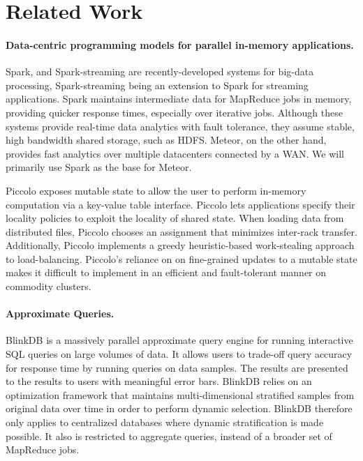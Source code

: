 \section{Related Work}

\paragraph{Data-centric programming models for parallel in-memory applications.}
Spark, and Spark-streaming \cite{spark} are recently-developed systems for big-data processing, Spark-streaming being an extension to Spark for streaming applications. Spark maintains intermediate data for MapReduce jobs in memory, providing quicker response times, especially over iterative jobs. Although these systems provide real-time data analytics with fault tolerance, they assume stable, high bandwidth shared storage, such as HDFS. Meteor, on the other hand, provides fast analytics over multiple datacenters connected by a WAN. We will primarily use Spark as the base for Meteor.  

Piccolo \cite{piccolo} exposes mutable state to allow the user to perform in-memory computation via a key-value table interface. Piccolo lets applications specify their locality policies to exploit the locality of shared state. When loading data from distributed files, Piccolo chooses an assignment that minimizes inter-rack transfer. Additionally, Piccolo implements a greedy heuristic-based work-stealing approach to load-balancing. Piccolo's reliance on on fine-grained updates to a mutable state makes it difficult to implement in an efficient and fault-tolerant manner on commodity clusters.

\paragraph{Approximate Queries.}
BlinkDB \cite{blinkdb} is a massively parallel approximate query engine for running interactive SQL queries on large volumes of data. It allows users to trade-off query accuracy for response time by running queries on data samples. The results are presented to the results to users with meaningful error bars. BlinkDB relies on an optimization framework that maintains multi-dimensional stratified samples from original data over time in order to perform dynamic selection. BlinkDB therefore only applies to centralized databases where dynamic stratification is made possible. It also is restricted to aggregate queries, instead of a broader set of MapReduce jobs.


